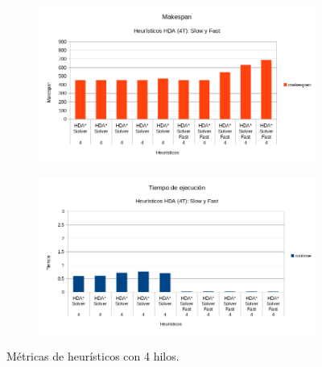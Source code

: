 \begin{figure}[h]
    \begin{subfigure}{.5\textwidth}
        \begin{center}
            \includegraphics[width=\textwidth]{Media/Ch2/Makespan_4_Heuristics.png}
        \end{center}
    \end{subfigure}
    \begin{subfigure}{.5\textwidth}
        \begin{center}
            \includegraphics[width=\textwidth]{Media/Ch2/Runtime_4_Heuristics.png}
        \end{center}
    \end{subfigure}
    \caption{Métricas de heurísticos con 4 hilos.}
    \label{fig:Heuristico4}
\end{figure}

